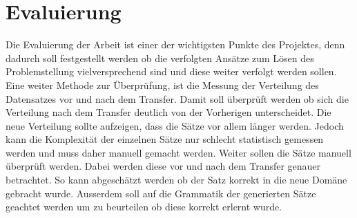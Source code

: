 \section{Evaluierung}
\label{sec:method_eval}
Die Evaluierung der Arbeit ist einer der wichtigsten Punkte des Projektes, denn dadurch soll festgestellt werden ob die
verfolgten Ansätze zum Lösen des Problemstellung vielversprechend sind und diese weiter verfolgt werden sollen.
\newline
\newline
Eine weiter Methode zur Überprüfung, ist die Messung der Verteilung des Datensatzes vor und nach dem Transfer. Damit
soll überprüft werden ob sich die Verteilung nach dem Transfer deutlich von der Vorherigen unterscheidet. Die neue
Verteilung sollte aufzeigen, dass die Sätze vor allem länger werden. Jedoch kann die Komplexität der
einzelnen Sätze nur schlecht statistisch gemessen werden und muss daher manuell gemacht werden.
\newline
\newline
Weiter sollen die Sätze manuell überprüft werden. Dabei werden diese vor und nach dem Transfer genauer betrachtet. So
kann abgeschätzt werden ob der Satz korrekt in die neue Domäne gebracht wurde. Ausserdem soll auf die Grammatik der
generierten Sätze geachtet werden um zu beurteilen ob diese korrekt erlernt wurde.

